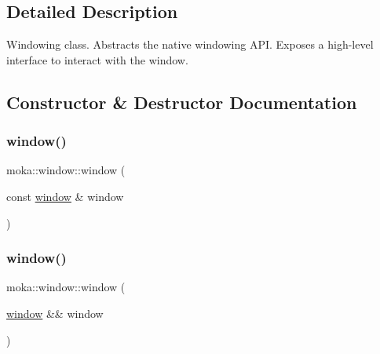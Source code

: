 \subsection{Detailed Description}
Windowing class. Abstracts the native windowing A\+PI. Exposes a high-\/level interface to interact with the window. 

\subsection{Constructor \& Destructor Documentation}
\mbox{\label{classmoka_1_1window_aa92731ac0e7e3f4b204f3a770d0a3016}} 
\subsubsection{\texorpdfstring{window()}{window()}\hspace{0.1cm}{\footnotesize\ttfamily [1/3]}}
{\footnotesize\ttfamily moka\+::window\+::window (\begin{DoxyParamCaption}\item[{const \mbox{\hyperlink{classmoka_1_1window}{window}} \&}]{window }\end{DoxyParamCaption})\hspace{0.3cm}{\ttfamily [delete]}}

\mbox{\label{classmoka_1_1window_adcf2b4d7098619cd9cbf2b83060a9fbf}} 
\subsubsection{\texorpdfstring{window()}{window()}\hspace{0.1cm}{\footnotesize\ttfamily [2/3]}}
{\footnotesize\ttfamily moka\+::window\+::window (\begin{DoxyParamCaption}\item[{\mbox{\hyperlink{classmoka_1_1window}{window}} \&\&}]{window }\end{DoxyParamCaption})\hspace{0.3cm}{\ttfamily [delete]}}

\mbox{\label{classmoka_1_1window_a65c37d2ed8385c4b1ab529724bbfdcc2}} 
